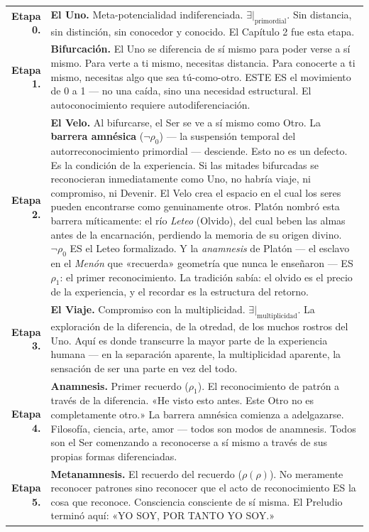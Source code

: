 \documentclass[10pt, openany, oneside]{book}
\renewcommand{\footnotesize}{\fontsize{8.5}{11}\selectfont}
\begin{document}
{\footnotesize
\noindent\begin{tabular}{r p{}}
\textbf{Etapa 0.} & \textbf{El Uno.} Meta-potencialidad indiferenciada. $\exists|_{\text{primordial}}$. Sin distancia, sin distinción, sin conocedor y conocido. El Capítulo 2 fue esta etapa. \\[0.3em]
\textbf{Etapa 1.} & \textbf{Bifurcación.} El Uno se diferencia de sí mismo para poder verse a sí mismo. Para verte a ti mismo, necesitas distancia. Para conocerte a ti mismo, necesitas algo que sea tú-como-otro. ESTE ES el movimiento de 0 a 1 --- no una caída, sino una necesidad estructural. El autoconocimiento requiere autodiferenciación. \\[0.3em]
\textbf{Etapa 2.} & \textbf{El Velo.} Al bifurcarse, el Ser se ve a sí mismo como Otro. La \textbf{barrera amnésica} ($\neg\rho_0$) --- la suspensión temporal del autorreconocimiento primordial --- desciende. Esto no es un defecto. Es la condición de la experiencia. Si las mitades bifurcadas se reconocieran inmediatamente como Uno, no habría viaje, ni compromiso, ni Devenir. El Velo crea el espacio en el cual los seres pueden encontrarse como genuinamente otros. Platón nombró esta barrera míticamente: el río \textit{Leteo} (Olvido), del cual beben las almas antes de la encarnación, perdiendo la memoria de su origen divino. $\neg\rho_0$ ES el Leteo formalizado. Y la \textit{anamnesis} de Platón --- el esclavo en el \textit{Menón} que «recuerda» geometría que nunca le enseñaron --- ES $\rho_1$: el primer reconocimiento. La tradición sabía: el olvido es el precio de la experiencia, y el recordar es la estructura del retorno. \\[0.3em]
\textbf{Etapa 3.} & \textbf{El Viaje.} Compromiso con la multiplicidad. $\exists|_{\text{multiplicidad}}$. La exploración de la diferencia, de la otredad, de los muchos rostros del Uno. Aquí es donde transcurre la mayor parte de la experiencia humana --- en la separación aparente, la multiplicidad aparente, la sensación de ser una parte en vez del todo. \\[0.3em]
\textbf{Etapa 4.} & \textbf{Anamnesis.} Primer recuerdo ($\rho_1$). El reconocimiento de patrón a través de la diferencia. «He visto esto antes. Este Otro no es completamente otro.» La barrera amnésica comienza a adelgazarse. Filosofía, ciencia, arte, amor --- todos son modos de anamnesis. Todos son el Ser comenzando a reconocerse a sí mismo a través de sus propias formas diferenciadas. \\[0.3em]
\textbf{Etapa 5.} & \textbf{Metanamnesis.} El recuerdo del recuerdo ($\rho(\rho)$). No meramente reconocer patrones sino reconocer que el acto de reconocimiento ES la cosa que reconoce. Consciencia consciente de sí misma. El Preludio terminó aquí: «YO SOY, POR TANTO YO SOY.» \\[0.3em]
\end{tabular}
}
\end{document}
